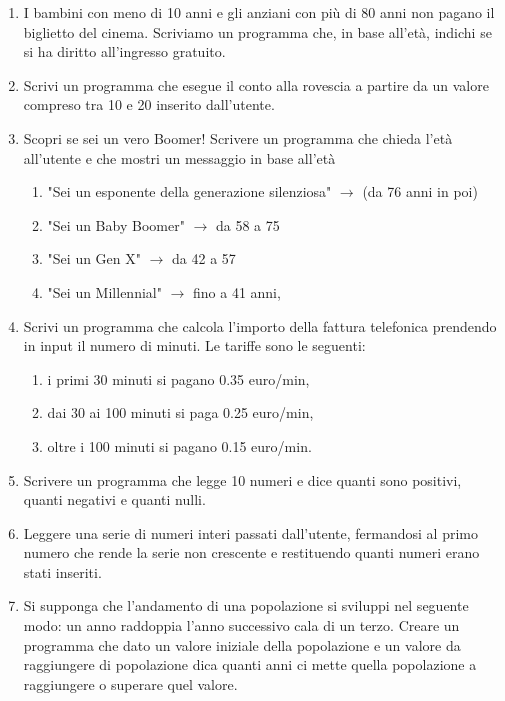 \documentclass{article}
\begin{document}
\begin{enumerate}
\item I bambini con meno di 10 anni e gli anziani con più di 80 anni non pagano il biglietto del cinema. Scriviamo un programma che, in base all’età, indichi se si ha diritto all’ingresso gratuito.

\item Scrivi un programma che esegue il conto alla rovescia a partire da un valore compreso tra 10 e 20 inserito dall'utente.

\item Scopri se sei un vero Boomer! Scrivere un programma che chieda l'età all'utente e che mostri un messaggio in base all'età
	\begin{enumerate}
	\item "Sei un esponente della generazione silenziosa" $\rightarrow$ (da 76 anni in poi)
	\item "Sei un Baby Boomer" $\rightarrow$ da 58 a 75
	\item "Sei un Gen X" $\rightarrow$ da 42 a 57
	\item "Sei un Millennial" $\rightarrow$ fino a 41 anni,
	\end{enumerate}

\item Scrivi un programma che calcola l’importo della fattura telefonica prendendo in input il numero di minuti. Le tariffe sono le seguenti:
	\begin{enumerate}
	\item i primi 30 minuti si pagano 0.35 euro/min,
	\item dai 30 ai 100 minuti si paga 0.25 euro/min,
	\item oltre i 100 minuti si pagano 0.15 euro/min.
	\end{enumerate}

\item Scrivere un programma che legge 10 numeri e dice quanti sono positivi, quanti negativi e quanti nulli.

\item Leggere una serie di numeri interi passati dall’utente, fermandosi al primo numero che rende la serie non crescente e restituendo quanti numeri erano stati inseriti.

\item Si supponga che l’andamento di una popolazione si sviluppi nel seguente modo: un anno raddoppia l’anno successivo cala di un terzo. Creare un programma che dato un valore iniziale della popolazione e un valore da raggiungere di popolazione dica quanti anni ci mette quella popolazione a raggiungere o superare quel valore.


\end{enumerate}
\end{document}
